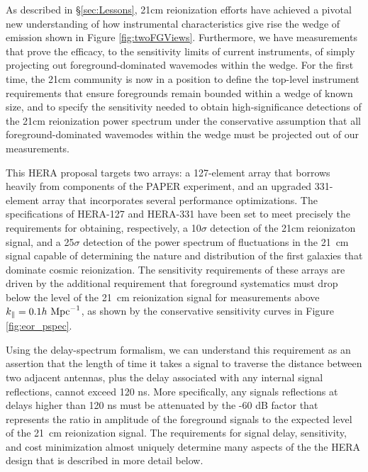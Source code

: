 \documentclass[preprint]{aastex}
\begin{document}

As described in \S\ref{sec:Lessons}, 21cm reionization efforts have achieved a
pivotal new understanding of how instrumental characteristics give rise the
wedge of emission shown in Figure \ref{fig:twoFGViews}.  Furthermore, we have
measurements that prove the efficacy, to the sensitivity limits of current
instruments, of simply projecting out foreground-dominated wavemodes within the
wedge.  For the first time, the 21cm community is now in a position to define
the top-level instrument requirements that ensure foregrounds remain bounded
within a wedge of known size, and to specify the sensitivity needed to obtain
high-significance detections of the 21cm reionization power spectrum under the
conservative assumption that all foreground-dominated wavemodes within the
wedge must be projected out of our measurements.

This HERA proposal targets two arrays: a 127-element array that borrows heavily
from components of the PAPER experiment, and an upgraded 331-element array that
incorporates several performance optimizations.  The specifications of HERA-127
and HERA-331 have been set to meet precisely the requirements for obtaining,
respectively, a 10$\sigma$ detection of the 21cm reionizaton signal, and a
25$\sigma$ detection of the power spectrum of fluctuations in the 21~cm signal
capable of determining the nature and distribution of the first galaxies that
dominate cosmic reionization.  The sensitivity requirements of these arrays are
driven by the additional requirement that foreground systematics must
drop below the level of the 21~cm reionization signal for measurements
above $k_\parallel=0.1h\ {\rm Mpc}^{-1}$, as shown by the conservative
sensitivity curves in Figure \ref{fig:eor_pspec}.

Using the delay-spectrum formalism, we can understand this requirement as an 
assertion that the length of time it takes a signal to traverse the distance
between two adjacent antennas, plus the delay associated with any internal signal reflections, 
cannot exceed 120 ns.  More specifically, any signals reflections at delays higher
than 120 ns must be attenuated by the -60 dB factor that represents the ratio in
amplitude of the foreground signals to the expected level of the 21~cm reionization signal.
The requirements for signal delay,
sensitivity, and cost minimization almost uniquely determine many aspects of the 
the HERA design that is described in more detail below.
\end{document}
